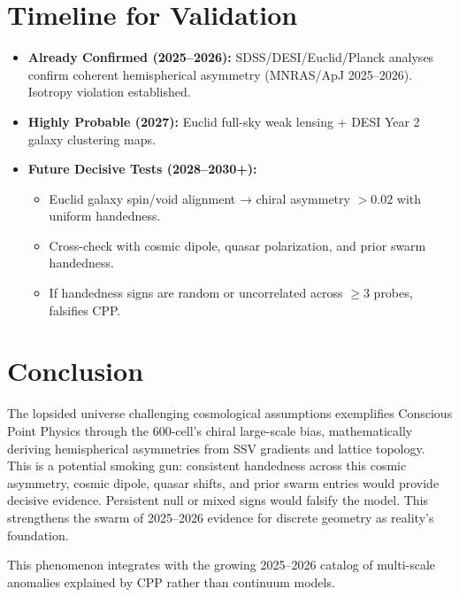 \documentclass[11pt]{article}
\begin{document}
\section{Timeline for Validation}
\begin{itemize}
    \item \textbf{Already Confirmed (2025--2026):} SDSS/DESI/Euclid/Planck analyses confirm coherent hemispherical asymmetry (MNRAS/ApJ 2025--2026). Isotropy violation established.
    \item \textbf{Highly Probable (2027):} Euclid full-sky weak lensing + DESI Year 2 galaxy clustering maps.
    \item \textbf{Future Decisive Tests (2028--2030+):}
    \begin{itemize}
        \item Euclid galaxy spin/void alignment → chiral asymmetry $>0.02$ with uniform handedness.
        \item Cross-check with cosmic dipole, quasar polarization, and prior swarm handedness.
        \item If handedness signs are random or uncorrelated across $\geq 3$ probes, falsifies CPP.
    \end{itemize}
\end{itemize}

\section{Conclusion}
The lopsided universe challenging cosmological assumptions exemplifies Conscious Point Physics through the 600-cell's chiral large-scale bias, mathematically deriving hemispherical asymmetries from SSV gradients and lattice topology. This is a potential smoking gun: consistent handedness across this cosmic asymmetry, cosmic dipole, quasar shifts, and prior swarm entries would provide decisive evidence. Persistent null or mixed signs would falsify the model. This strengthens the swarm of 2025--2026 evidence for discrete geometry as reality's foundation.

This phenomenon integrates with the growing 2025--2026 catalog of multi-scale anomalies explained by CPP rather than continuum models.
\end{document}
